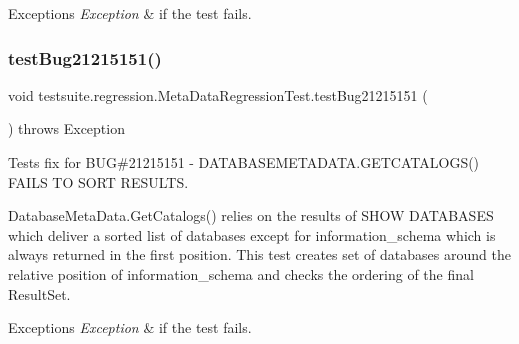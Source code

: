 \begin{DoxyExceptions}{Exceptions}
{\em Exception} & if the test fails. \\
\hline
\end{DoxyExceptions}
\mbox{\label{classtestsuite_1_1regression_1_1_meta_data_regression_test_ae3ea7a46828ed0725464d309295a2663}} 
\subsubsection{\texorpdfstring{test\+Bug21215151()}{testBug21215151()}}
{\footnotesize\ttfamily void testsuite.\+regression.\+Meta\+Data\+Regression\+Test.\+test\+Bug21215151 (\begin{DoxyParamCaption}{ }\end{DoxyParamCaption}) throws Exception}

Tests fix for B\+UG\#21215151 -\/ D\+A\+T\+A\+B\+A\+S\+E\+M\+E\+T\+A\+D\+A\+T\+A.\+G\+E\+T\+C\+A\+T\+A\+L\+O\+G\+S() F\+A\+I\+LS TO S\+O\+RT R\+E\+S\+U\+L\+TS.

Database\+Meta\+Data.\+Get\+Catalogs() relies on the results of \textquotesingle{}S\+H\+OW D\+A\+T\+A\+B\+A\+S\+ES\textquotesingle{} which deliver a sorted list of databases except for \textquotesingle{}information\+\_\+schema\textquotesingle{} which is always returned in the first position. This test creates set of databases around the relative position of \textquotesingle{}information\+\_\+schema\textquotesingle{} and checks the ordering of the final Result\+Set.


\begin{DoxyExceptions}{Exceptions}
{\em Exception} & if the test fails. \\
\hline
\end{DoxyExceptions}
\mbox{\label{classtestsuite_1_1regression_1_1_meta_data_regression_test_a45d7aaa5c8653a65c36f2e40ee7b154a}} 
